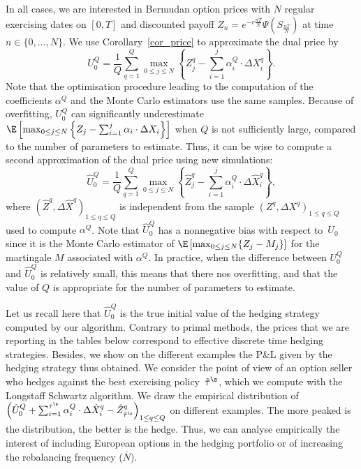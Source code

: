 In all cases, we are interested in Bermudan option prices with $N$ regular exercising dates on $[0,T]$ and discounted payoff $Z_n=e^{-r\frac{nT}N}\Psi(S_{\frac{nT}N})$ at time $n \in \{0,\dots, N\}$. We use Corollary~\ref{cor_price} to approximate the dual price by
$$ U_0^Q= \frac 1 Q \sum_{q=1}^Q \max_{0\le j \le N} \left\{ Z^q_{j} - \sum_{i=1}^j \alpha^Q_i \cdot \Delta X^q_i \right\}.$$ 
Note that the optimisation procedure leading to the computation of the coefficients $\alpha^Q$ and the Monte Carlo estimators use the same samples. Because of overfitting, $U_0^Q$ can significantly underestimate $\E \left[ \max_{0\le j \le N} \left\{ Z_{j} - \sum_{i=1}^j \alpha_i \cdot \Delta X_i \right\} \right]$ when $Q$ is not sufficiently large, compared to the number of parameters to estimate. Thus, it can be wise to compute a second approximation of the dual price using new simulations:
\begin{equation}
  \hat{U}_0^Q= \frac 1 Q \sum_{q=1}^Q \max_{0\le j \le N} \left\{ \hat{Z}^q_{j} - \sum_{i=1}^j \alpha^Q_i \cdot \Delta \hat{X}^q_i \right\},
\end{equation} 
where $(\hat{Z}^q,\Delta \hat{X}^q )_{1\le q \le Q}$ is independent from the sample $(Z^q,\Delta X^q )_{1\le q \le Q}$ used to compute $\alpha^Q$. Note that $\hat{U}_0^Q$ has a nonnegative bias with respect to~$U_0$ since it is the Monte Carlo estimator of $\E\left[ \max_{0 \le j \le N} \{Z_{j} - M_{j}\}\right]$ for the martingale $M$ associated with $\alpha^Q$. In practice, when the difference between $U_0^Q$ and $\hat{U}_0^Q$ is relatively small, this means that there nos  overfitting, and that the value of $Q$ is appropriate for the number of parameters to estimate. 

Let us recall here that $\hat{U}_0^Q$ is the true initial value of the hedging strategy computed by our algorithm. Contrary to primal methods, the prices that we are reporting in the tables below correspond to effective discrete time hedging strategies. Besides, we show on the different examples the P\&L given by the hedging strategy thus obtained. We consider the point of view of an option seller who hedges against the best exercising policy~$\hat{\tau}^\s$, which we compute with the Longstaff Schwartz algorithm. We draw the empirical distribution of $\left(\hat{U}_0^Q+ \sum_{i=1}^{\hat{\tau}^\s} \alpha_i^Q \cdot \Delta \hat{X}^q_i -\hat{Z}^q_{\hat{\tau}^\s}\right)_{1\le q \le Q}$ on different examples. The more peaked is the distribution, the better is the hedge. Thus, we can analyse empirically the interest of including European options in the hedging portfolio or of increasing the rebalancing frequency ($\bar{N}$).





